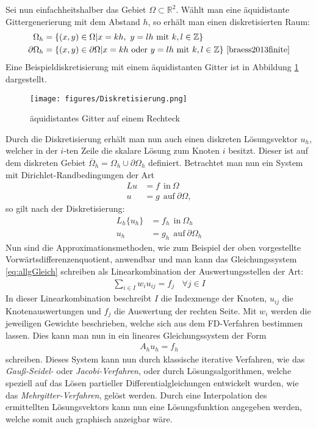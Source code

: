 \documentclass[a4paper,11pt]{article}
\begin{document}
Sei nun einfachheitshalber das Gebiet $\Omega\subset\mathbb{R}^2$. Wählt man eine äquidistante Gittergenerierung mit dem Abstand $h$, so erhält man einen diskretisierten Raum:
\begin{align}
 \Omega_h&=\{(x,y)\in\Omega|x=kh,~y=lh~\text{mit}~k,l\in\mathbb{Z}\}\nonumber\\
 \partial\Omega_h&=\{(x,y)\in\partial\Omega|x=kh~\text{oder}~y=lh~\text{mit}~k,l\in\mathbb{Z}\}\nonumber~\cite{braess2013finite}
\end{align}
Eine Beispieldiskretisierung mit einem äquidistanten Gitter ist in Abbildung \ref{fig:diskGit} dargestellt.
\begin{figure}[ht]
	\centering
	\texttt{[image: figures/Diskretisierung.png]}
	\caption[Diskretiesierung]{äquidistantes Gitter auf einem Rechteck}
	\label{fig:diskGit}
\end{figure}
Durch die Diskretisierung erhält man nun auch einen diskreten Lösungsvektor $u_h$, welcher in der $i$-ten Zeile die skalare Lösung zum Knoten $i$ besitzt. Dieser ist auf dem diskreten Gebiet $\overline{\Omega}_h=\Omega_h\cup\partial\Omega_h$ definiert. Betrachtet man nun ein System mit Dirichlet-Randbedingungen der Art
\begin{align}
 Lu&=f~~\text{in}~\Omega\nonumber\\
 u&=g~~\text{auf}~\partial\Omega\nonumber,
\end{align}
so gilt nach der Diskretisierung:
\begin{align}
 L_h\{u_h\}&=f_h~~\text{in}~\Omega_h\nonumber\\
 u_h&=g_h~~\text{auf}~\partial\Omega_h\label{eq:allgGleich}
\end{align}
Nun sind die Approximationsmethoden, wie zum Beispiel der oben vorgestellte Vorwärtsdifferenzenquotient, anwendbar und man kann das Gleichungssystem \eqref{eq:allgGleich} schreiben als Linearkombination der Auswertungsstellen der Art:
\begin{align}
 \sum_{i\in I}w_iu_{ij}=f_j~~~~\forall j\in I
\end{align}
In dieser Linearkombination beschreibt $I$ die Indexmenge der Knoten, $u_{ij}$ die Knotenauswertungen und $f_j$ die Auswertung der rechten Seite. Mit $w_i$ werden die jeweiligen Gewichte beschrieben, welche sich aus dem FD-Verfahren bestimmen lassen. Dies kann man nun in ein lineares Gleichungssystem der Form
\begin{align}
 A_hu_h=f_h
\end{align}
schreiben. Dieses System kann nun durch klassische iterative Verfahren, wie das \textit{Gauß-Seidel-} oder \textit{Jacobi-Verfahren}, oder durch Lösungsalgorithmen, welche speziell auf das Lösen partieller Differentialgleichungen entwickelt wurden, wie das \textit{Mehrgitter-Verfahren}, gelöst werden. Durch eine Interpolation des ermittellten Lösungsvektors kann nun eine Lösungsfunktion angegeben werden, welche somit auch graphisch anzeigbar wäre.
\end{document}
